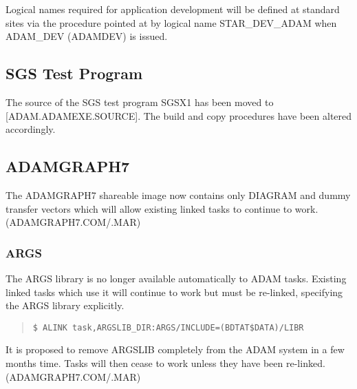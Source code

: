 Logical names required for application development will be defined at standard
sites via the procedure pointed at by logical name STAR\_DEV\_ADAM when 
ADAM\_DEV (ADAMDEV) is issued.

\subsection{SGS Test Program}
The source of the SGS test program SGSX1 has been moved to
[ADAM.ADAMEXE.SOURCE]. The build and copy procedures have been altered 
accordingly.

\subsection{ADAMGRAPH7}
The ADAMGRAPH7 shareable image now contains only DIAGRAM and dummy transfer
vectors which will allow existing linked tasks to continue to work.\\
(ADAMGRAPH7.COM/.MAR)

\subsubsection{ARGS}
\label{args}
The ARGS library is no longer available automatically to ADAM tasks. Existing
linked tasks which use it will continue to work but must be re-linked, 
specifying the ARGS library explicitly.
\begin{quote} \begin{verbatim}
$ ALINK task,ARGSLIB_DIR:ARGS/INCLUDE=(BDTAT$DATA)/LIBR
\end{verbatim} \end{quote}
It is proposed to remove ARGSLIB completely from the ADAM system in a few
months time.
Tasks will then cease to work unless they have been re-linked.\\
(ADAMGRAPH7.COM/.MAR)

